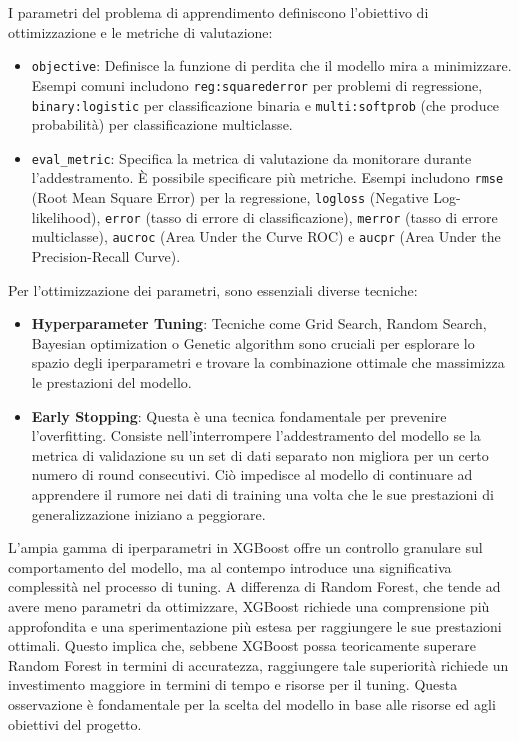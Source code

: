 \documentclass[a4paper,12pt]{report}
\begin{document}
	I parametri del problema di apprendimento definiscono l'obiettivo di ottimizzazione e le metriche di valutazione:
	\begin{itemize}
		\item \texttt{objective}: Definisce la funzione di perdita che il modello mira a minimizzare. Esempi comuni includono \texttt{reg:squarederror} per problemi di regressione, \texttt{binary:logistic} per classificazione binaria e \texttt{multi:softprob} (che produce probabilità) per classificazione multiclasse.
		\item \texttt{eval\_metric}: Specifica la metrica di valutazione da monitorare durante l'addestramento. È possibile specificare più metriche. Esempi includono \texttt{rmse} (Root Mean Square Error) per la regressione, \texttt{logloss} (Negative Log-likelihood), \texttt{error} (tasso di errore di classificazione), \texttt{merror} (tasso di errore multiclasse), \texttt{aucroc} (Area Under the Curve ROC) e \texttt{aucpr} (Area Under the Precision-Recall Curve).
	\end{itemize}
	Per l'ottimizzazione dei parametri, sono essenziali diverse tecniche:
	\begin{itemize}
		\item \textbf{Hyperparameter Tuning}: Tecniche come Grid Search, Random Search, Bayesian optimization o Genetic algorithm sono cruciali per esplorare lo spazio degli iperparametri e trovare la combinazione ottimale che massimizza le prestazioni del modello.
		\item \textbf{Early Stopping}: Questa è una tecnica fondamentale per prevenire l'overfitting. Consiste nell'interrompere l'addestramento del modello se la metrica di validazione su un set di dati separato non migliora per un certo numero di round consecutivi. Ciò impedisce al modello di continuare ad apprendere il rumore nei dati di training una volta che le sue prestazioni di generalizzazione iniziano a peggiorare.
	\end{itemize}
	L'ampia gamma di iperparametri in XGBoost offre un controllo granulare sul comportamento del modello, ma al contempo introduce una significativa complessità nel processo di tuning. A differenza di Random Forest, che tende ad avere meno parametri da ottimizzare, XGBoost richiede una comprensione più approfondita e una sperimentazione più estesa per raggiungere le sue prestazioni ottimali. Questo implica che, sebbene XGBoost possa teoricamente superare Random Forest in termini di accuratezza, raggiungere tale superiorità richiede un investimento maggiore in termini di tempo e risorse per il tuning. Questa osservazione è fondamentale per la scelta del modello in base alle risorse ed agli obiettivi del progetto.
	
\end{document}
